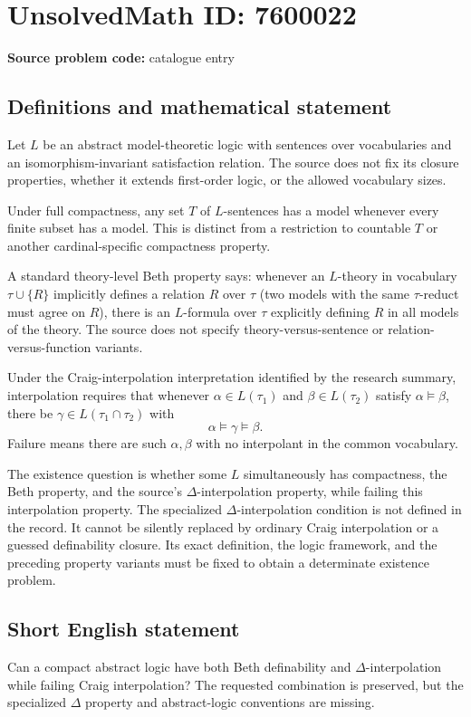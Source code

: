 \documentclass[11pt]{article}
\begin{document}
\section*{UnsolvedMath ID: 7600022}
\textbf{Source problem code:} catalogue entry
\subsection{Definitions and mathematical statement}
Let $L$ be an abstract model-theoretic logic with sentences over vocabularies and an isomorphism-invariant satisfaction relation. The source does not fix its closure properties, whether it extends first-order logic, or the allowed vocabulary sizes.

Under full compactness, any set $T$ of $L$-sentences has a model whenever every finite subset has a model. This is distinct from a restriction to countable $T$ or another cardinal-specific compactness property.

A standard theory-level Beth property says: whenever an $L$-theory in vocabulary $\tau\cup\{R\}$ implicitly defines a relation $R$ over $\tau$ (two models with the same $\tau$-reduct must agree on $R$), there is an $L$-formula over $\tau$ explicitly defining $R$ in all models of the theory. The source does not specify theory-versus-sentence or relation-versus-function variants.

Under the Craig-interpolation interpretation identified by the research summary, interpolation requires that whenever $\alpha\in L(\tau_1)$ and $\beta\in L(\tau_2)$ satisfy $\alpha\models\beta$, there be $\gamma\in L(\tau_1\cap\tau_2)$ with
\[
 \alpha\models\gamma\models\beta.
\]
Failure means there are such $\alpha,\beta$ with no interpolant in the common vocabulary.

The existence question is whether some $L$ simultaneously has compactness, the Beth property, and the source's $\Delta$-interpolation property, while failing this interpolation property. The specialized $\Delta$-interpolation condition is not defined in the record. It cannot be silently replaced by ordinary Craig interpolation or a guessed definability closure. Its exact definition, the logic framework, and the preceding property variants must be fixed to obtain a determinate existence problem.
\subsection{Short English statement}
Can a compact abstract logic have both Beth definability and $\Delta$-interpolation while failing Craig interpolation? The requested combination is preserved, but the specialized $\Delta$ property and abstract-logic conventions are missing.
\end{document}
